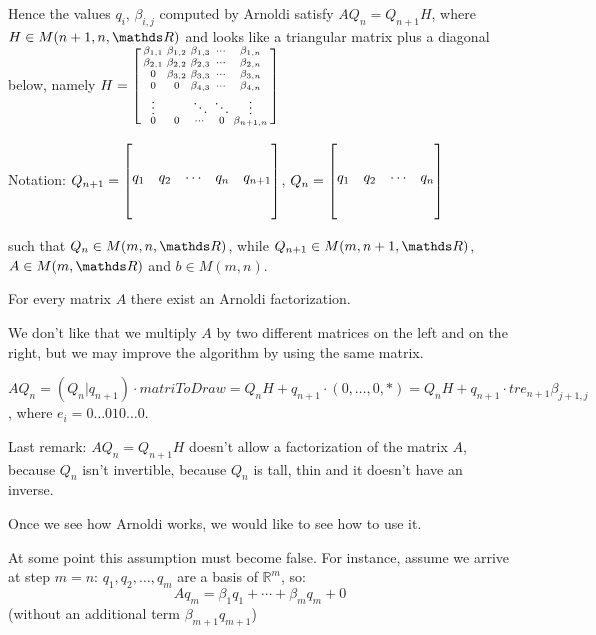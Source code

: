\documentclass[ComputationalMathematics.tex]{subfiles}
\begin{document}
 Hence the values $q_i$, $\beta_{i,j}$ computed by Arnoldi satisfy $AQ_n = Q_{n+1} H$, where $H \in M(n+1, n, \R)$ and looks like a triangular matrix plus a diagonal below, namely $H=
\begin{bsmallmatrix}
  \beta_{1, 1} & \beta_{1, 2} & \beta_{1, 3} & \cdots & \beta_{1,n}\\
  \beta_{2, 1} & \beta_{2, 2} & \beta_{2, 3} & \cdots & \beta_{2,n}\\
  0 & \beta_{3,2} & \beta_{3,3} & \cdots & \beta_{3,n}\\
  0 & 0 & \beta_{4,3} & \cdots & \beta_{4,n}\\
  \vdots & & \ddots & \ddots & \vdots\\
  0 & 0 & \cdots & 0 & \beta_{n+1, n}
\end{bsmallmatrix}$ 

 Notation: $Q_{n+1} = \begin{bmatrix}
  \rule[-10mm]{0pt}{20mm} q_1 & q_2 & \cdots & q_n & q_{n+1}
 \end{bmatrix}$, $Q_{n} = \begin{bmatrix}
  \rule[-10mm]{0pt}{20mm} q_1 & q_2 & \cdots & q_n
\end{bmatrix}$

such that $Q_{n} \in M(m, n, \R)$, while $Q_{n+1} \in M(m, n+1, \R)$, $A \in M(m, \R)$ and $b \in M(m, n)$.


For every matrix $A$ there exist an Arnoldi factorization.

We don't like that we multiply $A$ by two different matrices on the left and on the right, but we may improve the algorithm by using the same matrix.

$AQ_n  = (Q_n | q_{n+1}) \cdot matriToDraw = Q_n H + q_{n+1} \cdot (0, \ldots, 0, \ast) = Q_n H + q_{n+1} \cdot tr{e_{n+1}} \beta_{j+1, j}$, where $e_i = 0 \ldots 0 1 0 \ldots 0$.

Last remark: $AQ_n = Q_{n+1}H$ doesn't allow a factorization of the matrix $A$, because $Q_n$ isn't invertible, because $Q_n$ is tall, thin and it doesn't have an inverse.

Once we see how Arnoldi works, we would like to see how to use it.

At some point this assumption must become false. For instance, assume we arrive at step $m=n$: $q_1,q_2,\ldots,q_m$ are a basis of $\mathbb{R}^m$, so:
\[
Aq_m = \beta_1 q_1 + \cdots + \beta_m q_m + 0
\]
(without an additional term $\beta_{m+1} q_{m+1}$)
\end{document}

